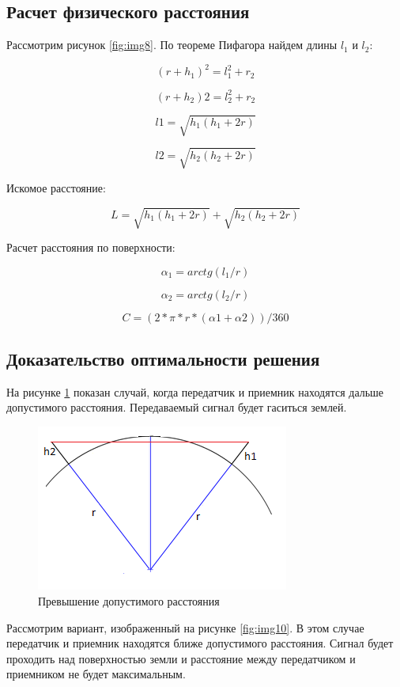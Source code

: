 \subsection{Расчет физического расстояния}

Рассмотрим рисунок \ref{fig:img8}. По теореме Пифагора найдем длины $ l_1 $ и $ l_2 $: 

\[
(r+h_{1})^2=l_1^{2}+r_2
\]

\[
(r+h_{2})2=l_2^{2}+r_2
\]

\[
l1=\sqrt{h_{1}\left(h_{1}+2r\right)}
\]

\[
l2=\sqrt{h_{2}\left(h_{2}+2r\right)}
\]

Искомое расстояние: 

\[
L=\sqrt{h_{1}\left(h_{1}+2r\right)}+\sqrt{h_{2}\left(h_{2}+2r\right)}
\]

Расчет расстояния по поверхности: 

\[
\alpha_{1}=arctg(l_{1}/r)
\]

\[
\alpha_{2}=arctg(l_{2}/r)
\]

\[
C=(2*\pi*r*(\alpha1+\alpha2))/360
\]

\subsection{Доказательство оптимальности решения}
На рисунке \ref{fig:img9} показан случай, когда передатчик и приемник находятся дальше допустимого расстояния. Передаваемый сигнал будет гаситься землей.

\begin{figure}[H]
\centering{}\includegraphics[width=3.27in,height=2.15in]{img/kich_bur/image9.png}
\caption{Превышение допустимого расстояния}
\label{fig:img9}
\end{figure}

Рассмотрим вариант, изображенный на рисунке \ref{fig:img10}. В этом случае передатчик и приемник находятся ближе допустимого расстояния. Сигнал будет проходить над поверхностью земли и расстояние между передатчиком и приемником не будет максимальным. 

